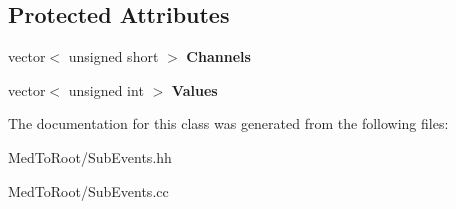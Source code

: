 \subsection*{Protected Attributes}
\begin{DoxyCompactItemize}
\item 
\mbox{\label{class_scaler_sub_event_aaedde4ea0a9fb4c43afaada4863d3173}} 
vector$<$ unsigned short $>$ {\bfseries Channels}
\item 
\mbox{\label{class_scaler_sub_event_ac07cb50429e195455d77552394c2c486}} 
vector$<$ unsigned int $>$ {\bfseries Values}
\end{DoxyCompactItemize}


The documentation for this class was generated from the following files\+:\begin{DoxyCompactItemize}
\item 
Med\+To\+Root/Sub\+Events.\+hh\item 
Med\+To\+Root/Sub\+Events.\+cc\end{DoxyCompactItemize}
